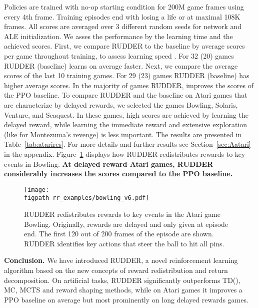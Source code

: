 \documentclass{article}
\newcommand{\figpath}{figures/}
\begin{document}
Policies are trained with no-op starting condition
for 200M game frames using every 4th frame.
Training episodes end with losing a life 
or at maximal 108K frames.
All scores are averaged over 3 different random seeds 
for network and ALE initialization.
We asses the performance by the learning time and
the achieved scores. 
First, we compare RUDDER to the baseline by
average scores per game throughout training, 
to assess learning speed \cite{Schulman:17}.
For 32 (20) games RUDDER (baseline) learns on average faster.
Next, we compare the average scores of the last 10 training games.
For 29 (23) games RUDDER (baseline) has higher average scores.
In the majority of games RUDDER, improves the scores of the PPO baseline.
To compare RUDDER and the baseline on Atari games that are 
characterize by delayed rewards, 
we selected the games Bowling, Solaris, Venture, and Seaquest.
In these games, high scores are achieved by learning the delayed reward, 
while learning the immediate reward and 
extensive exploration (like for Montezuma's revenge)
is less important.
The results are presented in Table~\ref{tab:atarires}.
For more details and further results see Section~\ref{sec:Aatari} in the appendix.
Figure~\ref{fig:bowlingExample}
displays how RUDDER redistributes rewards to key events 
in Bowling.
{\bf At delayed reward Atari games,
RUDDER considerably increases the scores compared to the PPO baseline.}

\begin{figure}[htp]
\begin{center}
\texttt{[image: \\figpath rr\_examples/bowling\_v6.pdf]} 
\caption{RUDDER redistributes rewards to key events in the Atari game Bowling.
Originally, rewards are delayed and only given at episode end.
The first 120 out of 200 frames of the episode are shown.
RUDDER identifies key actions that steer the ball to hit all pins.
\label{fig:bowlingExample}}
\end{center}
\end{figure}









{\bf Conclusion.} 
We have introduced RUDDER, a novel reinforcement learning 
algorithm based on the new concepts of reward redistribution
and return decomposition.
On artificial tasks,
RUDDER significantly outperforms TD(), MC, MCTS and reward shaping methods,
while on Atari games it improves a PPO baseline on average but 
most prominently on long delayed rewards games.
\end{document}
